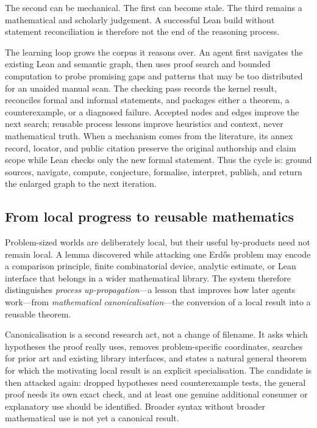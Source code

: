 \documentclass[10pt]{article}
\begin{document}
The second can be mechanical. The first can become stale. The third remains a
mathematical and scholarly judgement. A successful Lean build without statement
reconciliation is therefore not the end of the reasoning process.

The learning loop grows the corpus it reasons over. An agent first navigates
the existing Lean and semantic graph, then uses proof search and bounded
computation to probe promising gaps and patterns that may be too distributed
for an unaided manual scan. The checking pass records the kernel result,
reconciles formal and informal statements, and packages either a theorem, a
counterexample, or a diagnosed failure. Accepted nodes and edges improve the
next search; reusable process lessons improve heuristics and context, never
mathematical truth. When a mechanism comes from the literature, its annex
record, locator, and public citation preserve the original authorship and
claim scope while Lean checks only the new formal statement. Thus the cycle
is: ground sources, navigate, compute, conjecture, formalise, interpret,
publish, and return the enlarged graph to the next iteration.

\subsection{From local progress to reusable mathematics}

Problem-sized worlds are deliberately local, but their useful by-products
need not remain local. A lemma discovered while attacking one Erd\H{o}s problem
may encode a comparison principle, finite combinatorial device, analytic
estimate, or Lean interface that belongs in a wider mathematical library. The
system therefore distinguishes \emph{process up-propagation}---a lesson that
improves how later agents work---from \emph{mathematical
canonicalisation}---the conversion of a local result into a reusable theorem.

Canonicalisation is a second research act, not a change of filename. It asks
which hypotheses the proof really uses, removes problem-specific coordinates,
searches for prior art and existing library interfaces, and states a natural
general theorem for which the motivating local result is an explicit
specialisation. The candidate is then attacked again: dropped hypotheses need
counterexample tests, the general proof needs its own exact check, and at least
one genuine additional consumer or explanatory use should be identified.
Broader syntax without broader mathematical use is not yet a canonical
result.
\end{document}
